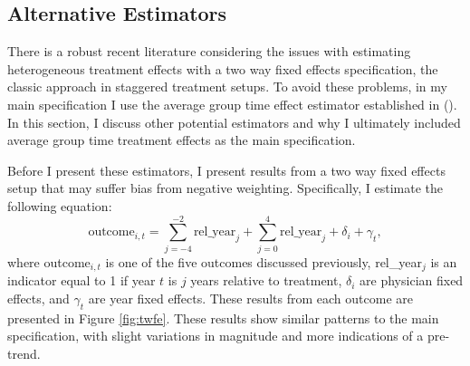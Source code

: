 \documentclass[12pt]{article}
\begin{document}
\subsection{Alternative Estimators}\label{app:estimators}

There is a robust recent literature considering the issues with estimating heterogeneous treatment effects with a two way fixed effects specification, the classic approach in staggered treatment setups. To avoid these problems, in my main specification I use the average group time effect estimator established in \citeauthor{callaway2021difference} (\citeyear{callaway2021difference}). In this section, I discuss other potential estimators and why I ultimately included average group time treatment effects as the main specification. 

Before I present these estimators, I present results from a two way fixed effects setup that may suffer bias from negative weighting. Specifically, I estimate the following equation:
$$\text{outcome}_{i,t}=\sum_{j=-4}^{-2} \text{rel\_year}_{j} + \sum_{j=0}^{4} \text{rel\_year}_{j} + \delta_i + \gamma_t,$$
where outcome$_{i,t}$ is one of the five outcomes discussed previously, rel\_year$_j$ is an indicator equal to 1 if year $t$ is $j$ years relative to treatment, $\delta_i$ are physician fixed effects, and $\gamma_t$ are year fixed effects.
These results from each outcome are presented in Figure \ref{fig:twfe}. These results show similar patterns to the main specification, with slight variations in magnitude and more indications of a pre-trend. 
\end{document}
